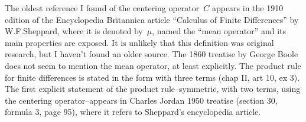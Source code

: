 The oldest reference I found of the centering operator~$C$ appears in the
1910 edition of the Encyclopedia Britannica article ``Calculus of Finite
Differences'' by W.F.Sheppard, where it is denoted by~$\mu$, named the ``mean
operator'' and its main properties are exposed.  It is unlikely that this
definition was original research, but I haven't found an older source.  The
1860 treatise by George Boole does not seem to mention the mean operator, at
least explicitly.  The product rule for finite differences is stated in the
form with three terms (chap II, art 10, ex 3).  The first explicit statement
of the product rule--symmetric, with two terms, using the centering
operator--appears in Charles Jordan 1950 treatise (section 30, formula 3,
page 95), where it refers to Sheppard's encyclopedia article.




